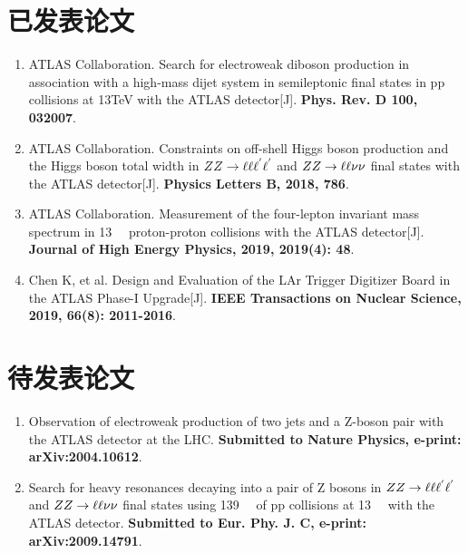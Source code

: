 
\begin{publications}

\section*{已发表论文}

\begin{enumerate}
    \item ATLAS Collaboration. Search for electroweak diboson production in association with a high-mass dijet system in semileptonic final states in pp collisions at 13TeV with the ATLAS detector[J]. \textbf{Phys. Rev. D 100, 032007}.
    \item ATLAS Collaboration. Constraints on off-shell Higgs boson production and the Higgs boson total width in $ZZ \rightarrow \ell\ell\ell^{'}\ell^{'}$ and $ZZ \rightarrow \ell\ell\nu\nu$ final states with the ATLAS detector[J]. \textbf{Physics Letters B, 2018, 786}.
    \item ATLAS Collaboration. Measurement of the four-lepton invariant mass spectrum in 13~\tev~ proton-proton collisions with the ATLAS detector[J]. \textbf{Journal of High Energy Physics, 2019, 2019(4): 48}.
    \item Chen K, et al. Design and Evaluation of the LAr Trigger Digitizer Board in the ATLAS Phase-I Upgrade[J]. \textbf{IEEE Transactions on Nuclear Science, 2019, 66(8): 2011-2016}.
\end{enumerate}

\section*{待发表论文}

\begin{enumerate}
    \item Observation of electroweak production of two jets and a Z-boson pair with the ATLAS detector at the LHC. \textbf{Submitted to Nature Physics, e-print: arXiv:2004.10612}.
    \item Search for heavy resonances decaying into a pair of Z bosons in $ZZ \rightarrow \ell\ell\ell^{'}\ell^{'}$ and $ZZ \rightarrow \ell\ell\nu\nu$ final states using 139~\ifb~ of pp collisions at 13~\tev~ with the ATLAS detector. \textbf{Submitted to Eur. Phy. J. C, e-print: arXiv:2009.14791}.
\end{enumerate}


\end{publications}
